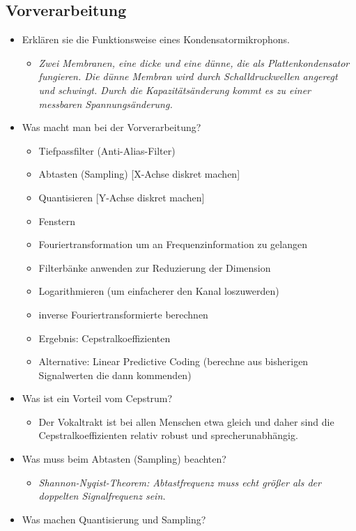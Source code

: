 \documentclass[11pt]{article}
\begin{document}
\subsection{Vorverarbeitung}
\begin{itemize}
\item Erklären sie die Funktionsweise eines Kondensatormikrophons.
\begin{itemize}
\item \emph{Zwei Membranen, eine dicke und eine dünne, die als Plattenkondensator fungieren. Die dünne Membran wird durch Schalldruckwellen angeregt und schwingt. Durch die Kapazitätsänderung kommt es zu einer messbaren Spannungsänderung.}
\end{itemize}
\item Was macht man bei der Vorverarbeitung?
\begin{itemize}
\item Tiefpassfilter (Anti-Alias-Filter)
\item Abtasten (Sampling) [X-Achse diskret machen]
\item Quantisieren [Y-Achse diskret machen]
\item Fenstern
\item Fouriertransformation um an Frequenzinformation zu gelangen
\item Filterbänke anwenden zur Reduzierung der Dimension
\item Logarithmieren (um einfacherer den Kanal loszuwerden)
\item inverse Fouriertransformierte berechnen
\item Ergebnis: Cepstralkoeffizienten
\item Alternative: Linear Predictive Coding (berechne aus bisherigen Signalwerten die dann kommenden)
\end{itemize}
\item Was ist ein Vorteil vom Cepstrum? 
\begin{itemize}
\item Der Vokaltrakt ist bei allen Menschen etwa gleich und daher sind die Cepstralkoeffizienten relativ robust und sprecherunabhängig.
\end{itemize}
\item Was muss beim Abtasten (Sampling) beachten?
\begin{itemize}
\item \emph{Shannon-Nyqist-Theorem: Abtastfrequenz muss echt größer als der doppelten Signalfrequenz sein.}
\end{itemize}
\item Was machen Quantisierung und Sampling?

\end{itemize}
\end{document}
